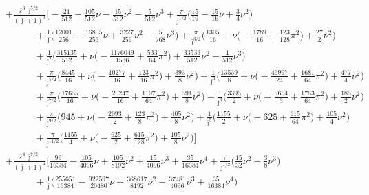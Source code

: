 \documentclass[prd,superscriptaddress,preprintnumbers,tightenlines,nofootinbib, eqsecnum]{revtex4-2}
\newcommand{\nn}{\nonumber}
\begin{document}
\begin{align}
&+ \frac{\bar{\varepsilon}^{3}\,\bar{\jmath}^{5/2}}{(\bar{\jmath}+1)^{3}}\Bigg[
-\frac{21}{512} + \frac{105}{512}\nu - \frac{15}{512}\nu^{2} - \frac{5}{512}\nu^{3} + \frac{\pi}{\bar{\jmath}^{1/2}}\Bigg(\frac{15}{16} - \frac{15}{16}\nu + \frac{3}{4}\nu^{2}\Bigg) \nn \\
&\qquad\quad + \frac{1}{\bar{\jmath}}\Bigg(\frac{12001}{256} - \frac{16805}{256}\nu + \frac{3227}{256}\nu^{2} - \frac{5}{768}\nu^{3}\Bigg)  + \frac{\pi}{\bar{\jmath}^{3/2}}\Bigg(\frac{1305}{16} + \nu\bigg(-\frac{1789}{16} + \frac{123}{128}\pi^{2}\bigg) + \frac{27}{2}\nu^{2}\Bigg) \nn \\
&\qquad\quad + \frac{1}{\bar{\jmath}^{2}}\Bigg(\frac{315135}{512} + \nu\bigg(-\frac{1176049}{1536} + \frac{533}{64}\pi^{2}\bigg) + \frac{33533}{512}\nu^{2} - \frac{1}{512}\nu^{3}\Bigg)  \nn \\
&\qquad\quad + \frac{\pi}{\bar{\jmath}^{5/2}}\Bigg(\frac{8445}{16} + \nu\bigg(-\frac{10277}{16} + \frac{123}{16}\pi^{2}\bigg) + \frac{393}{8}\nu^{2}\Bigg) + \frac{1}{\bar{\jmath}^{3}}\Bigg(\frac{13539}{8} + \nu\bigg(-\frac{46997}{24} + \frac{1681}{64}\pi^{2}\bigg) + \frac{477}{4}\nu^{2}\Bigg) \nn \\
&\qquad\quad + \frac{\pi}{\bar{\jmath}^{7/2}}\Bigg(\frac{17655}{16} + \nu\bigg(-\frac{20247}{16} + \frac{1107}{64}\pi^{2}\bigg) + \frac{591}{8}\nu^{2}\Bigg) + \frac{1}{\bar{\jmath}^{4}}\Bigg(\frac{3395}{2} + \nu\bigg(-\frac{5654}{3} + \frac{1763}{64}\pi^{2}\bigg) + \frac{185}{2}\nu^{2}\Bigg) \nn \\
&\qquad\quad + \frac{\pi}{\bar{\jmath}^{9/2}}\Bigg(945 + \nu\bigg(-\frac{2093}{2} + \frac{123}{8}\pi^{2}\bigg) + \frac{405}{8}\nu^{2}\Bigg) + \frac{1}{\bar{\jmath}^{5}}\Bigg(\frac{1155}{2} + \nu\bigg(-625 + \frac{615}{64}\pi^{2}\bigg) + \frac{105}{4}\nu^{2}\Bigg) \nn \\
&\qquad\quad + \frac{\pi}{\bar{\jmath}^{11/2}}\Bigg(\frac{1155}{4} + \nu\bigg(-\frac{625}{2} + \frac{615}{128}\pi^{2}\bigg) + \frac{105}{8}\nu^{2}\Bigg)\Bigg] \nn \\
&+ \frac{\bar{\varepsilon}^{4}\,\bar{\jmath}^{7/2}}{(\bar{\jmath}+1)^{4}}\Bigg[
\frac{99}{16384} - \frac{105}{4096}\nu + \frac{105}{8192}\nu^{2} + \frac{15}{4096}\nu^{3} + \frac{35}{16384}\nu^{4} + \frac{\pi}{\bar{\jmath}^{1/2}}\Bigg(\frac{15}{32}\nu^{2} - \frac{3}{8}\nu^{3}\Bigg) \nn \\
&\qquad\quad + \frac{1}{\bar{\jmath}}\Bigg(\frac{255651}{16384} - \frac{922597}{20480}\nu + \frac{368617}{8192}\nu^{2} - \frac{37481}{4096}\nu^{3} + \frac{35}{16384}\nu^{4}\Bigg) \nn \\

\end{align}
\end{document}
